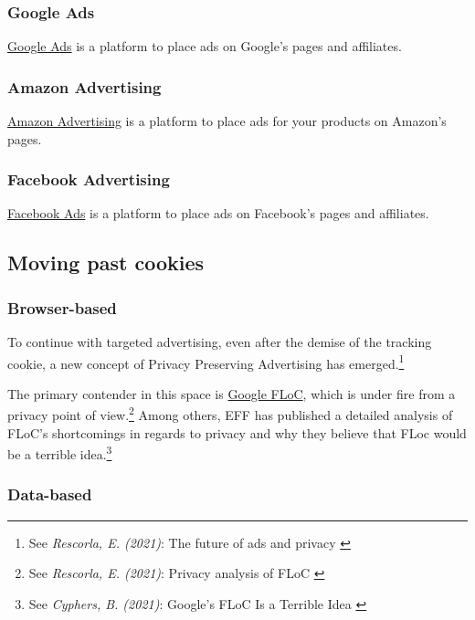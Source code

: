 \subsubsection{Google Ads}

\href{https://ads.google.com/home/}{Google Ads} is a platform to place ads on Google's pages and affiliates.

\subsubsection{Amazon Advertising}

\href{https://advertising.amazon.com//}{Amazon Advertising} is a platform to place ads for your products on Amazon's pages.

\subsubsection{Facebook Advertising}

\href{https://www.facebook.com/business/ads}{Facebook Ads} is a platform to place ads on Facebook's pages and affiliates.

\subsection{Moving past cookies}

\subsubsection{Browser-based}

To continue with targeted advertising, even after the demise of the tracking cookie, a new concept of Privacy Preserving Advertising has emerged.\footnote{See \textit{Rescorla, E. (2021)}: The future of ads and privacy \cite{futureAds}}

The primary contender in this space is \href{https://wicg.github.io/floc/}{Google FLoC}, which is under fire from a privacy point of view.\footnote{See \textit{Rescorla, E. (2021)}: Privacy analysis of FLoC \cite{privacyFloc}} Among others, EFF has published a detailed analysis of FLoC's shortcomings in regards to privacy and why they believe that FLoc would be a terrible idea.\footnote{See \textit{Cyphers, B. (2021)}: Google’s FLoC Is a Terrible Idea \cite{terribleIdea}}

\subsubsection{Data-based}

